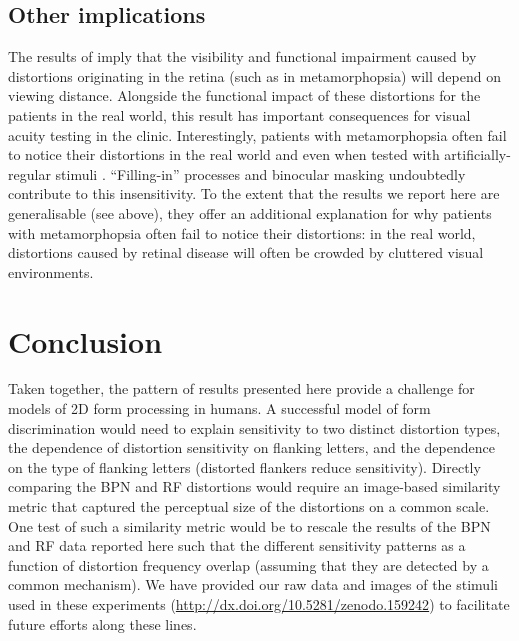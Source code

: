 \documentclass[doc, 11pt,a4paper,natbib]{apa6}\usepackage[]{graphicx}\usepackage[]{color}
\begin{document}
\subsection{Other implications}
The results of \citet{wiecek_metamorphopsia_2014} imply that the visibility and functional impairment caused by distortions originating in the retina (such as in metamorphopsia) will depend on viewing distance.
Alongside the functional impact of these distortions for the patients in the real world, this result has important consequences for visual acuity testing in the clinic.
Interestingly, patients with metamorphopsia often fail to notice their distortions in the real world \citep{wiecek_metamorphopsia_2015} and even when tested with artificially-regular stimuli \citep{crossland_amsler_2007,schuchard_validity_1993,wiecek_metamorphopsia_2015}.
``Filling-in'' processes \citep{crossland_amsler_2007} and binocular masking \citep{wiecek_metamorphopsia_2015} undoubtedly contribute to this insensitivity.
To the extent that the results we report here are generalisable (see above), they \citep[along with][]{bex_sensitivity_2010} offer an additional explanation for why patients with metamorphopsia often fail to notice their distortions: in the real world, distortions caused by retinal disease will often be crowded by cluttered visual environments.


\section{Conclusion}

Taken together, the pattern of results presented here provide a challenge for models of 2D form processing in humans.
A successful model of form discrimination would need to explain sensitivity to two distinct distortion types, the dependence of distortion sensitivity on flanking letters, and the dependence on the type of flanking letters (distorted flankers reduce sensitivity).
Directly comparing the BPN and RF distortions would require an image-based similarity metric that captured the perceptual size of the distortions on a common scale.
One test of such a similarity metric would be to rescale the results of the BPN and RF data reported here such that the different sensitivity patterns as a function of distortion frequency overlap (assuming that they are detected by a common mechanism).
We have provided our raw data and images of the stimuli used in these experiments (\url{http://dx.doi.org/10.5281/zenodo.159242}) to facilitate future efforts along these lines.
\end{document}
